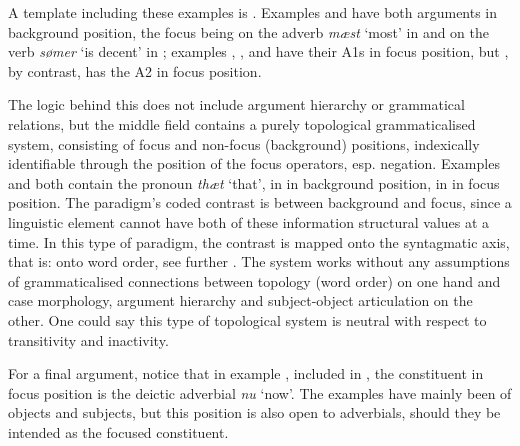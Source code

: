 \documentclass[output=paper]{langscibook}
\begin{document}
A template including these examples is . Examples  and  have both arguments in background position, the focus being on the adverb \textit{mæst} ‘most' in  and on the verb \textit{sømer} ‘is decent' in ; examples , , and  have their A1s in focus position, but , by contrast, has the A2 in focus position.

  The logic behind this does not include argument hierarchy or grammatical relations, but the middle field contains a purely topological grammaticalised system, consisting of focus and non-focus (background) positions, indexically identifiable through the position of the focus operators, esp. negation. Examples  and  both contain the pronoun \textit{thæt} ‘that', in  in background position, in  in focus position. The paradigm's coded contrast is between background and focus, since a linguistic element cannot have both of these information structural values at a time. In this type of paradigm, the contrast is mapped onto the syntagmatic axis, that is: onto word order, see further \citet{Heltoft2019}. The system works without any assumptions of grammaticalised connections between topology (word order) on one hand and case morphology, argument hierarchy and subject-object articulation on the other. One could say this type of topological system is neutral with respect to transitivity and inactivity.

For a final argument, notice that in example , included in , the constituent in focus position is the deictic adverbial \textit{nu} ‘now'. The examples have mainly been of objects and subjects, but this position is also open to adverbials, should they be intended as the focused constituent.
\end{document}
